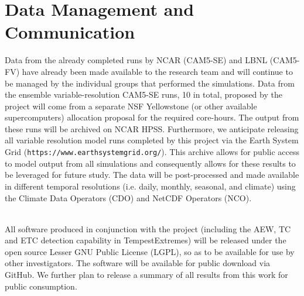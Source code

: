 \documentclass[11pt]{article}
\begin{document}
\appendix

\setcounter{section}{9}

\section{Data Management and Communication}

Data from the already completed runs by NCAR (CAM5-SE) and LBNL (CAM5-FV) have already been made available to the research team and will continue to be managed by the individual groups that performed the simulations. Data from the ensemble variable-resolution CAM5-SE runs, 10 in total, proposed by the project will come from a separate NSF Yellowstone (or other available supercomputers) allocation proposal for the required core-hours. The output from these runs will be archived on NCAR HPSS. Furthermore, we anticipate releasing all variable resolution model runs completed by this project via the Earth System Grid (\texttt{https://www.earthsystemgrid.org/}). This archive allows for public access to model output from all simulations and consequently allows for these results to be leveraged for future study. The data will be post-processed and made available in different temporal resolutions (i.e. daily, monthly, seasonal, and climate) using the Climate Data Operators (CDO) and NetCDF Operators (NCO).

\ \\

\noindent All software produced in conjunction with the project (including the AEW, TC and ETC detection capability in TempestExtremes) will be released under the open source Lesser GNU Public License (LGPL), so as to be available for use by other investigators. The software will be available for public download via GitHub. We further plan to release a summary of all results from this work for public consumption.

  
\end{document}
